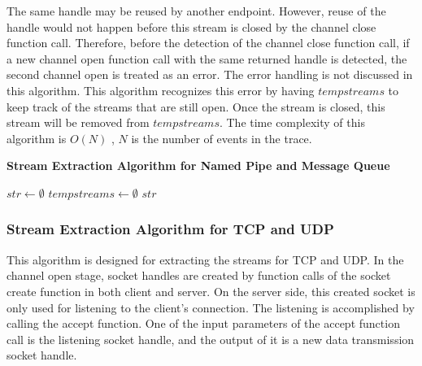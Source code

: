 The same handle may be reused by another endpoint. However, reuse of the handle would not happen before this stream is closed by the channel close function call. Therefore, before the detection of the channel close function call, if a new channel open function call with the same returned handle is detected, the second channel open is treated as an error. The error handling is not discussed in this algorithm. This algorithm recognizes this error by having $tempstreams$ to keep track of the streams that are still open. Once the stream is closed, this stream will be removed from $tempstreams$. The time complexity of this algorithm is $O(N)$ , $N$ is the number of events in the trace.

\begin{algorithm}[H]
\DontPrintSemicolon
\caption{{\bf Stream Extraction Algorithm for Named Pipe and Message Queue} \label{streamext1}}
$str \leftarrow \emptyset$\; 
$tempstreams \leftarrow \emptyset$\;
\KwRet $str$\;
\end{algorithm} 

\subsubsection{Stream Extraction Algorithm for TCP and UDP}
This algorithm is designed for extracting the streams for TCP and UDP. In the channel open stage, socket handles are created by function calls of the socket create function in both client and server. On the server side, this created socket is only used for listening to the client's connection. The listening is accomplished by calling the accept function. One of the input parameters of the accept function call is the listening socket handle, and the output of it is a new data transmission socket handle. 


